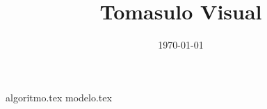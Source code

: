 \documentclass{article}
\author{}
\title{Tomasulo Visual}
\date{\today}
\begin{document}
    \maketitle

    {algoritmo.tex}
    {modelo.tex}
\end{document}
